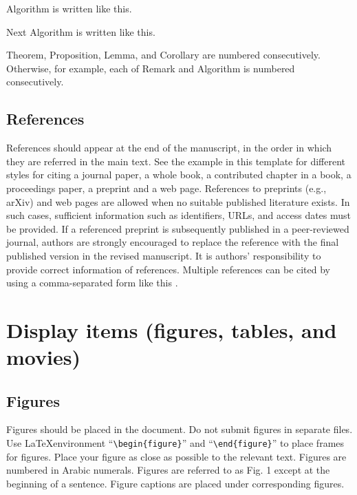 \documentclass{jasse}%
\begin{document}
\begin{algorithm}
Algorithm is written like this.
\end{algorithm}

\begin{algorithm}
Next Algorithm is written like this.
\end{algorithm}

Theorem, Proposition, Lemma, and Corollary are numbered consecutively. Otherwise, for example, each of Remark and Algorithm is numbered consecutively.

\subsection{References}
References should appear at the end of the manuscript, in the order in which they are referred in the main text.
See the example in this template for different styles for citing a journal paper, a whole book, a contributed chapter in a book, a proceedings paper, a preprint and a web page.
References to preprints (e.g., arXiv) and web pages are allowed when no suitable published literature exists.
In such cases, sufficient information such as identifiers, URLs, and access dates must be provided.
If a referenced preprint is subsequently published in a peer-reviewed journal, authors are strongly encouraged to replace the reference with the final published version in the revised manuscript.
It is authors' responsibility to provide correct information of references.
Multiple references can be cited by using a comma-separated form like this \cite{journal_paper,journal_paper_example,inproceedings}.

\section{Display items (figures, tables, and movies)}

\subsection{Figures}
Figures should be placed in the document.
Do not submit figures in separate files.
Use \LaTeX environment ``\verb|\begin{figure}|'' and ``\verb|\end{figure}|'' to place frames for figures.
Place your figure as close as possible to the relevant text.
Figures are numbered in Arabic numerals.
Figures are referred to as Fig. 1 except at the beginning of a sentence.
Figure captions are placed under corresponding figures.
\end{document}
